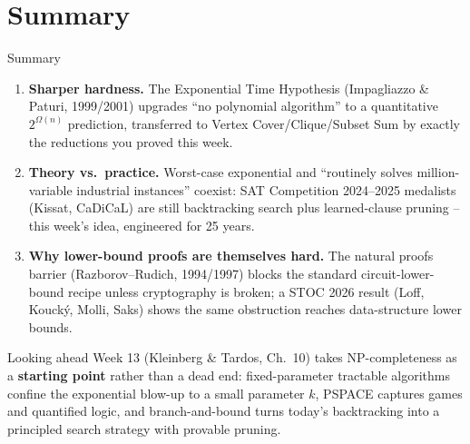 \documentclass[11pt,aspectratio=169]{beamer}
\begin{document}
\section{Summary}

\begin{frame}{Summary}
  \footnotesize
  \begin{enumerate}
    \item \textbf{Sharper hardness.} The Exponential Time Hypothesis (Impagliazzo \&
    Paturi, 1999/2001) upgrades ``no polynomial algorithm'' to a quantitative
    $2^{\Omega(n)}$ prediction, transferred to Vertex Cover/Clique/Subset Sum by exactly
    the reductions you proved this week.
    \item \textbf{Theory vs.\ practice.} Worst-case exponential and
    ``routinely solves million-variable industrial instances'' coexist: SAT
    Competition 2024--2025 medalists (Kissat, CaDiCaL) are still backtracking search
    plus learned-clause pruning -- this week's idea, engineered for 25 years.
    \item \textbf{Why lower-bound proofs are themselves hard.} The natural proofs
    barrier (Razborov--Rudich, 1994/1997) blocks the standard circuit-lower-bound
    recipe unless cryptography is broken; a STOC 2026 result (Loff, Kouck\'{y}, Molli,
    Saks) shows the same obstruction reaches data-structure lower bounds.
  \end{enumerate}
  \begin{alertblock}{Looking ahead}
    Week 13 (Kleinberg \& Tardos, Ch.\ 10) takes NP-completeness as a
    \textbf{starting point} rather than a dead end: fixed-parameter tractable
    algorithms confine the exponential blow-up to a small parameter $k$, PSPACE
    captures games and quantified logic, and branch-and-bound turns today's
    backtracking into a principled search strategy with provable pruning.
  \end{alertblock}
\end{frame}
\end{document}
